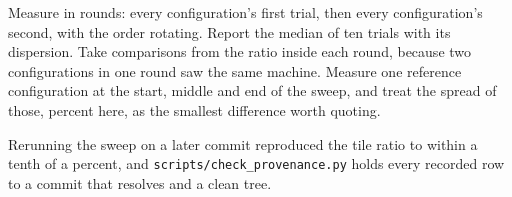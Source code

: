  Measure in rounds: every configuration's first trial, then every
configuration's second, with the order rotating. Report the median of ten trials with its
dispersion. Take comparisons from the ratio inside each round, because two configurations in one
round saw the same machine. Measure one reference configuration at the start, middle and end of
the sweep, and treat the spread of those, \RepeatabilitySpread{} percent here, as the smallest
difference worth quoting.

 Rerunning the sweep on a later commit reproduced the tile ratio to within a
tenth of a percent, and \texttt{scripts/check\_provenance.py} holds every recorded row to a commit
that resolves and a clean tree.

